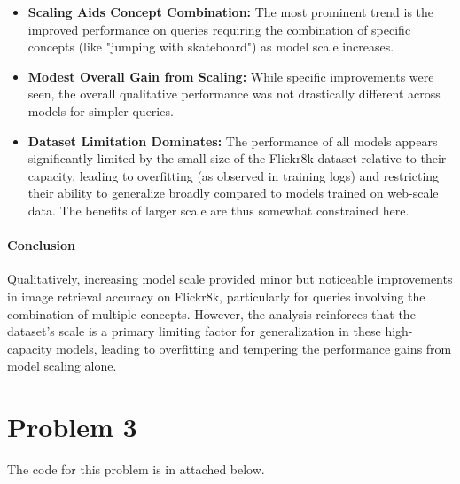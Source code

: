 \documentclass{article}
\begin{document}
\begin{itemize}
    \item \textbf{Scaling Aids Concept Combination:} The most prominent trend is the improved performance on queries requiring the combination of specific concepts (like "jumping with skateboard") as model scale increases.
    \item \textbf{Modest Overall Gain from Scaling:} While specific improvements were seen, the overall qualitative performance was not drastically different across models for simpler queries.
    \item \textbf{Dataset Limitation Dominates:} The performance of all models appears significantly limited by the small size of the Flickr8k dataset relative to their capacity, leading to overfitting (as observed in training logs) and restricting their ability to generalize broadly compared to models trained on web-scale data. The benefits of larger scale are thus somewhat constrained here.
\end{itemize}

\paragraph{Conclusion}

Qualitatively, increasing model scale provided minor but noticeable improvements in image retrieval accuracy on Flickr8k, particularly for queries involving the combination of multiple concepts. However, the analysis reinforces that the dataset's scale is a primary limiting factor for generalization in these high-capacity models, leading to overfitting and tempering the performance gains from model scaling alone.



\section*{Problem 3}

The code for this problem is in attached below.
\end{document}
